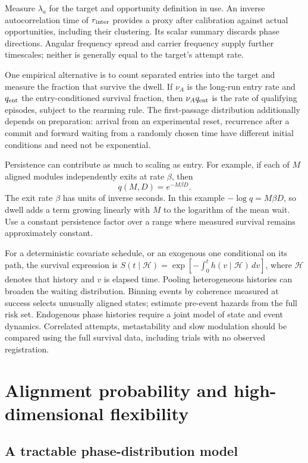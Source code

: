 \documentclass[11pt]{article}
\begin{document}
Measure $\lambda_a$ for the target and opportunity definition in use.
An inverse autocorrelation time of $r_{\rm inter}$ provides a proxy after
calibration against actual opportunities, including their clustering.
Its scalar summary discards phase directions. Angular frequency spread
and carrier frequency supply further timescales; neither is generally
equal to the target's attempt rate.

One empirical alternative is to count separated entries into the target
and measure the fraction that survive the dwell. If $\nu_A$ is the
long-run entry rate and $q_{\rm ent}$ the entry-conditioned survival
fraction, then $\nu_Aq_{\rm ent}$ is the rate of qualifying episodes,
subject to the rearming rule. The first-passage distribution additionally
depends on preparation: arrival from an experimental reset, recurrence
after a commit and forward waiting from a randomly chosen time have
different initial conditions and need not be exponential.

Persistence can contribute as much to scaling as entry. For example,
if each of $M$ aligned modules independently exits at rate $\beta$,
then
\begin{equation}
 q(M,D)=e^{-M\beta D}.
 \label{eq:dwell}
\end{equation}
The exit rate $\beta$ has units of inverse seconds. In this example
$-\log q=M\beta D$, so dwell adds a term growing linearly with $M$
to the logarithm of the mean wait. Use a constant persistence factor
over a range where measured survival remains approximately constant.

For a deterministic covariate schedule, or an exogenous one conditional
on its path, the survival expression is
$S(t\mid\mathcal H)=\exp[-\int_0^t h(v\mid\mathcal H)\,dv]$, where
$\mathcal H$ denotes that history and $v$ is elapsed time. Pooling
heterogeneous histories can broaden the waiting distribution. Binning
events by coherence measured at success selects unusually aligned
states; estimate pre-event hazards from the full risk set. Endogenous
phase histories require a joint model of state and event dynamics. Correlated
attempts, metastability and slow modulation should be compared using
the full survival data, including trials with no observed registration.

\section{Alignment probability and high-dimensional flexibility}
\subsection{A tractable phase-distribution model}
\end{document}
